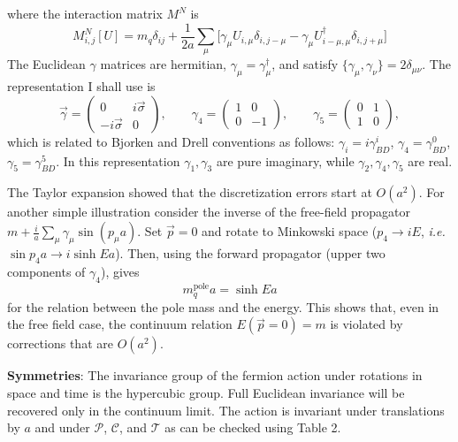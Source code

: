 where the interaction matrix $M^N$ is
\begin{equation}
\label{eq:naiveactM}
M_{i,j}^N[U] = m_q\delta_{ij} + \frac{1}{2a}\sum_\mu
\big[ \gamma_\mu U_{i,\mu}\delta_{i,j-\mu} -
      \gamma_\mu U_{i-\mu,\mu}^\dagger\delta_{i,j+\mu} \big]
\end{equation}
The Euclidean $\gamma$ matrices are hermitian, $\gamma_\mu = \gamma_\mu^\dagger$,
and satisfy $\{\gamma_\mu,\gamma_\nu\} = 2\delta_{\mu\nu}$. The
representation I shall use is
\begin{equation}
\label{eq:gammamatdef}
\vec\gamma = \begin{pmatrix} 0 & i\vec\sigma \\ -i\vec\sigma & 0 \end{pmatrix},
\qquad
\gamma_4 = \begin{pmatrix} 1 & 0 \\ 0 & -1 \end{pmatrix},
\qquad
\gamma_5 = \begin{pmatrix} 0 & 1 \\ 1 & 0 \end{pmatrix} ,
\end{equation}
which is related to Bjorken and Drell conventions as follows:
$\gamma_i = i\gamma_{BD}^i$, $\gamma_4 = \gamma_{BD}^0$,
$\gamma_5 = \gamma_{BD}^5$. In this representation $\gamma_1, \gamma_3$ are
pure imaginary, while $\gamma_2, \gamma_4, \gamma_5$ are real.

The Taylor expansion showed that the discretization errors start at
$O(a^2)$. For another simple illustration consider the inverse of the
free-field propagator $m + \frac{i}{a}\sum_\mu\gamma_\mu\sin(p_\mu a)$. Set
$\vec{p}=0$ and rotate to Minkowski space ($p_4 \to iE$, \textit{i.e.}
$\sin p_4 a \to i\sinh Ea$). Then, using the forward propagator (upper two
components of $\gamma_4$), gives
\begin{equation}
\label{eq:Npolemass}
m_q^{\mathrm{pole}} a = \sinh Ea
\end{equation}
for the relation between the pole mass and the energy. This shows that, even
in the free field case, the continuum relation $E(\vec{p}=0) = m$ is violated
by corrections that are $O(a^2)$.

\noindent\textbf{Symmetries}: The invariance group of the fermion action
under rotations in space and time is the hypercubic group. Full Euclidean
invariance will be recovered only in the continuum limit. The action is
invariant under translations by $a$ and under $\mathcal{P}$, $\mathcal{C}$,
and $\mathcal{T}$ as can be checked using Table 2.


